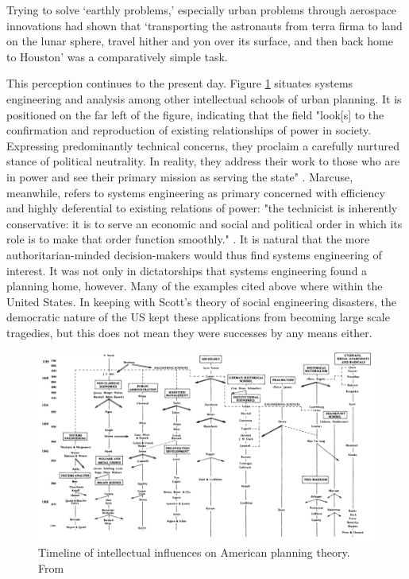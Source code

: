 \vspace{-7mm}

\begin{singlespcquote}
Trying to solve `earthly problems,' especially urban problems through aerospace innovations had shown that `transporting the astronauts from terra firma to land on the lunar sphere, travel hither and yon over its surface, and then back home to Houston' was a comparatively simple task. \cite{lightWarfareWelfareDefense2005}
\end{singlespcquote}

This perception continues to the present day. Figure \ref{fig:friedman_timeline} situates systems engineering and analysis among other intellectual schools of urban planning. It is positioned on the far left of the figure, indicating that the field "look[s] to the confirmation and reproduction of existing relationships of power in society. Expressing predominantly technical concerns, they proclaim a carefully nurtured stance of political neutrality. In reality, they address their work to those who are in power and see their primary mission as serving the state" \cite{mazza2017}. Marcuse, meanwhile, refers to systems engineering as primary concerned with efficiency and highly deferential to existing relations of power: "the technicist is inherently conservative: it is to serve an economic and social and political order in which its role is to make that order function smoothly." \cite{marcuseThreeHistoricCurrents2016}. It is natural that the more authoritarian-minded decision-makers would thus find systems engineering of interest. It was not only in dictatorships that systems engineering found a planning home, however. Many of the examples cited above where within the United States. In keeping with Scott's theory of social engineering disasters, the democratic nature of the US kept these applications from becoming large scale tragedies, but this does not mean they were successes by any means either. 

\clearpage
\begin{figure}
	\centering
	\includegraphics[scale=0.60]{Figures/chap2/friedman_timeline.png}
	\caption[Timeline of intellectual influences on American planning theory]{Timeline of intellectual influences on American planning theory. From \cite{mazza2017}}
	\label{fig:friedman_timeline}
\end{figure}
\clearpage

